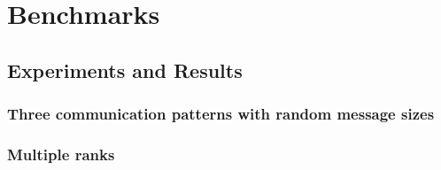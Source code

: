 \section{Benchmarks}
\label{sec:benchmark}









\subsection{Experiments and Results}

\subsubsection {Three communication patterns with random message sizes}


\subsubsection {Multiple ranks}

